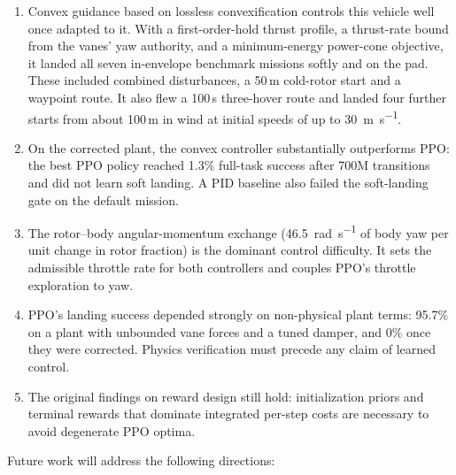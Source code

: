 \documentclass[conference]{IEEEtran}
\begin{document}
\begin{enumerate}
    \item Convex guidance based on lossless convexification \cite{b21} controls this vehicle well once adapted to it. With a first-order-hold thrust profile, a thrust-rate bound from the vanes' yaw authority, and a minimum-energy power-cone objective, it landed all seven in-envelope benchmark missions softly and on the pad. These included combined disturbances, a 50\,m cold-rotor start and a waypoint route. It also flew a 100\,s three-hover route and landed four further starts from about 100\,m in wind at initial speeds of up to \SI{30}{\metre\per\second}.
    \item On the corrected plant, the convex controller substantially outperforms PPO: the best PPO policy reached 1.3\% full-task success after 700M transitions and did not learn soft landing. A PID baseline also failed the soft-landing gate on the default mission.
    \item The rotor--body angular-momentum exchange (\SI{46.5}{\radian\per\second} of body yaw per unit change in rotor fraction) is the dominant control difficulty. It sets the admissible throttle rate for both controllers and couples PPO's throttle exploration to yaw.
    \item PPO's landing success depended strongly on non-physical plant terms: 95.7\% on a plant with unbounded vane forces and a tuned damper, and 0\% once they were corrected. Physics verification must precede any claim of learned control.
    \item The original findings on reward design still hold: initialization priors and terminal rewards that dominate integrated per-step costs are necessary to avoid degenerate PPO optima.
\end{enumerate}

Future work will address the following directions:
\end{document}
